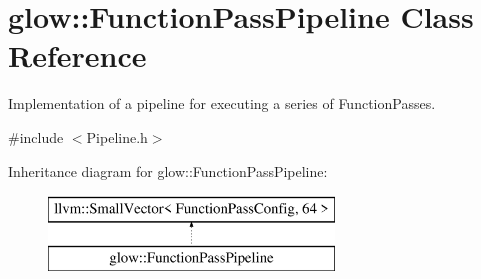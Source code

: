 \hypertarget{classglow_1_1_function_pass_pipeline}{}\section{glow\+:\+:Function\+Pass\+Pipeline Class Reference}
\label{classglow_1_1_function_pass_pipeline}


Implementation of a pipeline for executing a series of Function\+Passes.  




{\ttfamily \#include $<$Pipeline.\+h$>$}

Inheritance diagram for glow\+:\+:Function\+Pass\+Pipeline\+:\begin{figure}[H]
\begin{center}
\leavevmode
\includegraphics[height=2.000000cm]{classglow_1_1_function_pass_pipeline}
\end{center}
\end{figure}
